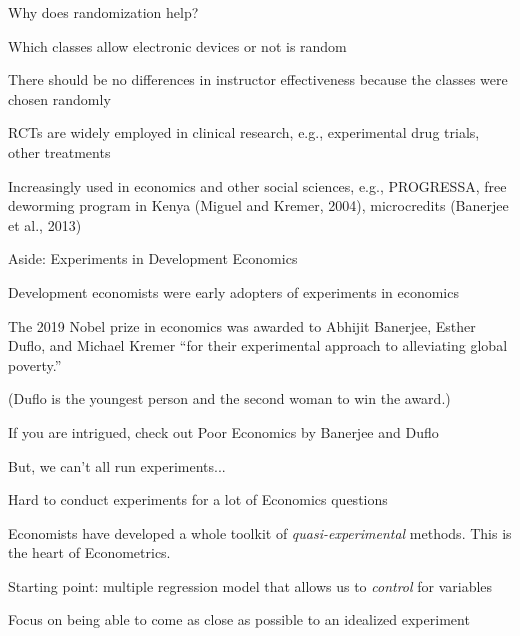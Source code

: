\documentclass{./../div_teaching_slides}
\begin{document}
\begin{frame}{Why does randomization help?}
\begin{witemize}
  \item Which classes allow electronic devices or not is random
  \item There should be no differences in instructor effectiveness because the classes were chosen randomly
  \item RCTs are widely employed in clinical research, e.g., experimental drug trials, other treatments
  \item Increasingly used in economics and other social sciences, e.g., PROGRESSA, free deworming program in Kenya (Miguel and Kremer, 2004), microcredits (Banerjee et al., 2013)
\end{witemize}
\end{frame}

\begin{frame}{\large Aside: Experiments in Development Economics}
\begin{witemize}
  \item Development economists were early adopters of experiments in economics
  \item The 2019 Nobel prize in economics was awarded to Abhijit Banerjee, Esther Duflo, and Michael Kremer ``for their experimental approach to alleviating global poverty.''
  \item (Duflo is the youngest person and the second woman to win the award.)
  \item If you are intrigued, check out Poor Economics by Banerjee and Duflo
\end{witemize}
\end{frame}

\begin{frame}{But, we can't all run experiments...}
\begin{witemize}
\item Hard to conduct experiments for a lot of Economics questions
\item Economists have developed a whole toolkit of \textit{quasi-experimental} methods. This is the heart of Econometrics.  
\item Starting point: multiple regression model that allows us to \textit{control} for variables
\item Focus on being able to come as close as possible to an idealized experiment
\end{witemize}
\end{frame}
\end{document}
